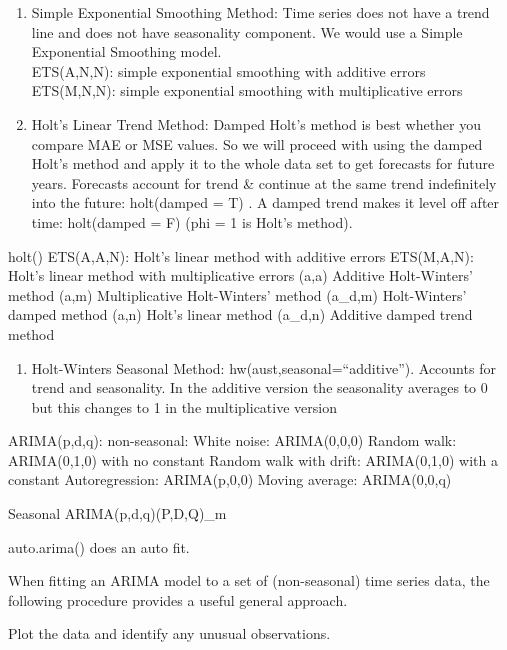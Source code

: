 \documentclass[]{book}
\providecommand{\tightlist}{%
  \setlength{\itemsep}{0pt}\setlength{\parskip}{0pt}}
\begin{document}
\begin{enumerate}
\def\labelenumi{\arabic{enumi}.}
\item
  Simple Exponential Smoothing Method: Time series does not have a trend
  line and does not have seasonality component. We would use a Simple
  Exponential Smoothing model.\\
  ETS(A,N,N): simple exponential smoothing with additive errors
  \textbar{} ETS(M,N,N): simple exponential smoothing with
  multiplicative errors
\item
  Holt's Linear Trend Method: Damped Holt's method is best whether you
  compare MAE or MSE values. So we will proceed with using the damped
  Holt's method and apply it to the whole data set to get forecasts for
  future years. Forecasts account for trend \& continue at the same
  trend indefinitely into the future: holt(damped = T) . A damped trend
  makes it level off after time: holt(damped = F) (phi = 1 is Holt's
  method).
\end{enumerate}

holt() \textbar{} ETS(A,A,N): Holt's linear method with additive errors
\textbar{} ETS(M,A,N): Holt's linear method with multiplicative errors
\textbar{} (a,a) Additive Holt-Winters' method \textbar{} (a,m)
Multiplicative Holt-Winters' method \textbar{} (a\_d,m) Holt-Winters'
damped method \textbar{} (a,n) Holt's linear method \textbar{} (a\_d,n)
Additive damped trend method

\begin{enumerate}
\def\labelenumi{\arabic{enumi}.}
\setcounter{enumi}{7}
\tightlist
\item
  Holt-Winters Seasonal Method: hw(aust,seasonal=``additive''). Accounts
  for trend and seasonality. In the additive version the seasonality
  averages to 0 but this changes to 1 in the multiplicative version
\end{enumerate}

ARIMA(p,d,q): non-seasonal: White noise: ARIMA(0,0,0) Random walk:
ARIMA(0,1,0) with no constant Random walk with drift: ARIMA(0,1,0) with
a constant Autoregression: ARIMA(p,0,0) Moving average: ARIMA(0,0,q)

Seasonal ARIMA(p,d,q)(P,D,Q)\_m

auto.arima() does an auto fit.

When fitting an ARIMA model to a set of (non-seasonal) time series data,
the following procedure provides a useful general approach.

Plot the data and identify any unusual observations.
\end{document}
